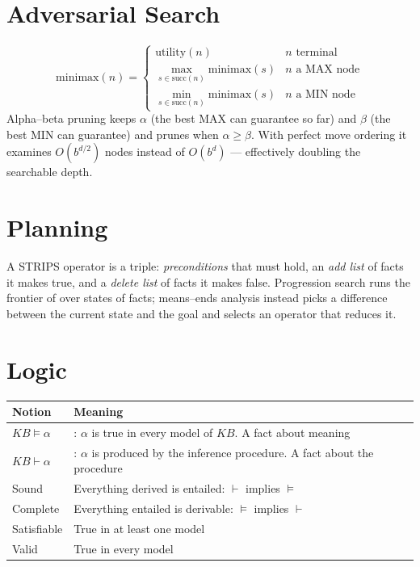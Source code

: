 \section{Adversarial Search}

\[
  \mathrm{minimax}(n) =
  \begin{cases}
    \mathrm{utility}(n) & n \text{ terminal} \\
    \max_{s \in \mathrm{succ}(n)} \mathrm{minimax}(s) & n \text{ a MAX node} \\
    \min_{s \in \mathrm{succ}(n)} \mathrm{minimax}(s) & n \text{ a MIN node}
  \end{cases}
\]
Alpha--beta pruning keeps $\alpha$ (the best MAX can guarantee so far) and $\beta$
(the best MIN can guarantee) and prunes when $\alpha \ge \beta$. With perfect move
ordering it examines $O(b^{d/2})$ nodes instead of $O(b^{d})$ --- effectively
doubling the searchable depth.

\section{Planning}

A STRIPS operator is a triple: \emph{preconditions} that must hold, an \emph{add
list} of facts it makes true, and a \emph{delete list} of facts it makes false.
Progression search runs the frontier of  over states of facts;
means--ends analysis instead picks a difference between the current state and the
goal and selects an operator that reduces it.

\section{Logic}

\begin{longtable}{@{}L{3.2cm}L{11.8cm}@{}}
\toprule
{}
\textbf{Notion} & \textbf{Meaning} \\
\midrule
\endhead
$\mathit{KB} \models \alpha$ & : $\alpha$ is true in every model
of $\mathit{KB}$. A fact about meaning \\
$\mathit{KB} \vdash \alpha$ & : $\alpha$ is produced by the
inference procedure. A fact about the procedure \\
Sound & Everything derived is entailed: $\vdash$ implies $\models$ \\
Complete & Everything entailed is derivable: $\models$ implies $\vdash$ \\
Satisfiable & True in at least one model \\
Valid & True in every model \\
\bottomrule
\end{longtable}

